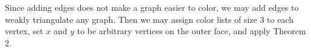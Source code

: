 \documentclass[11pt,letter]{article}
\begin{document}
\noindent Since adding edges does not make a graph easier to color, we may add edges to weakly triangulate
any graph. Then we may assign color lists of size $3$ to each vertex, set $x$ and $y$ to be arbitrary
vertices on the outer face, and apply Theorem 2.


\begin{comment}
\begin{proof}
Let $w\in N_C(z)$ be the closest vertex to $y$ between $z$ and $y$ along the outer face, allowing $w=y$.

We will proceed by removing one vertex from $P$ at a time. Let us set $L(v)=L(v)-\alpha$ for
each $v\in N_{G-P}(x)$. Thus for $v\in N_{G-P}$, if $v\in C$ then $|L(v)|\ge1$ and $|L(v)|\ge2$ otherwise.
Let $w$ and $z$ be the vertices immediately prior and immediately following $x$ in $C$ respectively.
By applying Theorem 2 we may remove $x$.\\

\noindent We continue the above process, recursing on all blocks produced, until all path vertices are removed.
Let $G-P=G_0,G_1,\ldots,G_k$ be the blocks produced. We then proceed through each $G_i$ from first split to last
split.\\

\noindent Suppose $y\not\in G_i$. If $G_i\cap P-x\ne\emptyset$ we color $G_i$ with Theorem 3 using the cutvertices
as $x$ and $y$, and $G_i\cap P-x\ne\emptyset$ as the path. Otherwise we color $G_i$ with Theorem 4 using
cutvertices as $x$ and $y$.\\

\noindent Suppose $y\in G_i$. By our construction of Path $P$ we know either $y$ is a cutvertex, or
one cutvertex $c$ has $|L(c)|\ge2$. In this case we color $G_i$ in the manner described above and find
$c$ has been colored some color, we will call $\omega$. Then let us color . In this way we ensure that \\

\noindent Otherewise, by Theorem 2, let $G-p=G_0,G_1,\ldots,G_k$ ordered such that $G_0$ is the block
containing $w$ and proceeding over until $G_k$ is the block containing $z$. Clearly $G_0$ and $G_k$ will
have a single cutvertex and each $G_i$, $0<i<k$, will have two. Furthermore, $c\in G_i$ is a cutvertex
if and only if we had $c\in C\cap N_G(x)$ and therefore the cutvertices, and vertices $w$ and $z$ are exactly
the vertices guaranteed
$|L(v)|\ge1$. All other vertices $v$ on the outer face of each $G_i$ will have $|L(v)|\ge2$ and remaining
interior vertices will still have $|L(v)|\ge3$.\\


\end{comment}
\end{document}
